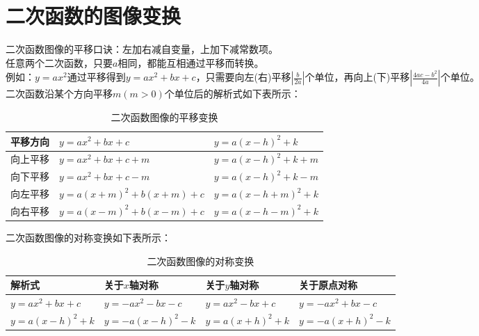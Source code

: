 \section{二次函数的图像变换}
\begin{theorem}
    二次函数图像的平移口诀：左加右减自变量，上加下减常数项。 \\
    任意两个二次函数，只要$a$相同，都能互相通过平移而转换。\\
    例如：$y=ax^2$通过平移得到$y=ax^2+bx+c$，只需要向左(右)平移$|\frac{b}{2a}|$个单位，再向上(下)平移$|\frac{4ac-b^2}{4a}|$个单位。\\
    二次函数沿某个方向平移$m(m>0)$个单位后的解析式如下表所示：
\end{theorem}
\begin{table}[H]
    \centering
    \caption{二次函数图像的平移变换}
    \begin{tabular}{l|l|l}
        \hline
        \hline
        平移方向 & $y=ax^2+bx+c$         & $y=a(x-h)^2+k$   \\
        \hline
        向上平移 & $y=ax^2+bx+c+m$       & $y=a(x-h)^2+k+m$ \\
        向下平移 & $y=ax^2+bx+c-m$       & $y=a(x-h)^2+k-m$ \\
        向左平移 & $y=a(x+m)^2+b(x+m)+c$ & $y=a(x-h+m)^2+k$ \\
        向右平移 & $y=a(x-m)^2+b(x-m)+c$ & $y=a(x-h-m)^2+k$ \\
        \hline
        \hline
    \end{tabular}
\end{table}
\begin{theorem}
    二次函数图像的对称变换如下表所示：
\end{theorem}
\begin{table}[H]
    \centering
    \caption{二次函数图像的对称变换}
    \begin{tabular}{l|l|l|l}
        \hline
        \hline
        解析式            & 关于$x$轴对称        & 关于$y$轴对称       & 关于原点对称          \\
        \hline
        $y=ax^2+bx+c$  & $y=-ax^2-bx-c$  & $y=ax^2-bx+c$  & $y=-ax^2+bx-c$  \\
        $y=a(x-h)^2+k$ & $y=-a(x-h)^2-k$ & $y=a(x+h)^2+k$ & $y=-a(x+h)^2-k$ \\
        \hline
        \hline
    \end{tabular}
\end{table}
\clearpage
